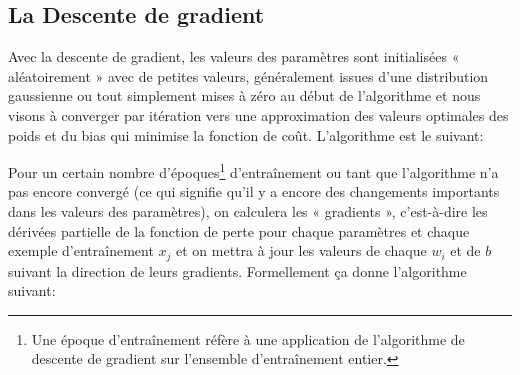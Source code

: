 \subsection{La Descente de gradient}
\label{chap4.sec5.sub2}
Avec la descente de gradient, les valeurs des paramètres sont initialisées « aléatoirement » avec de petites valeurs, généralement issues d'une distribution gaussienne ou tout simplement mises à zéro au début de l'algorithme et nous visons à converger par itération vers une approximation des valeurs optimales des poids et du bias qui minimise la fonction de coût. L'algorithme est le suivant:

Pour un certain nombre d'époques\footnote{Une époque d'entraînement réfère à une application de l'algorithme de descente de gradient sur l'ensemble d'entraînement entier.} d'entraînement ou tant que l'algorithme n'a pas encore convergé (ce qui signifie qu'il y a encore des changements importants dans les valeurs des paramètres), on calculera les « gradients », c'est-à-dire les dérivées partielle de la fonction de perte pour chaque paramètres et chaque exemple d'entraînement \(x_j\) et on mettra à jour les valeurs de chaque \(w_i\) et de \(b\) suivant la direction de leurs gradients. Formellement ça donne l'algorithme suivant:

